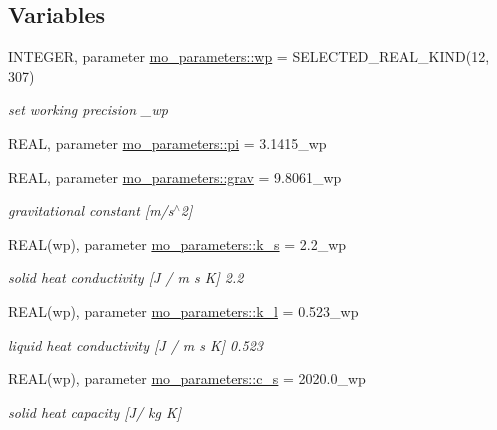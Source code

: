 \subsection*{Variables}
\begin{DoxyCompactItemize}
\item 
INTEGER, parameter \hyperlink{namespacemo__parameters_a41be20bed1dcec244405328deaaffe30}{mo\_\-parameters::wp} = SELECTED\_\-REAL\_\-KIND(12, 307)
\begin{DoxyCompactList}\small\item\em set working precision \_\-wp \item\end{DoxyCompactList}\item 
REAL, parameter \hyperlink{namespacemo__parameters_ae2c1c26c67cd8e13b7693bbe2c5b717a}{mo\_\-parameters::pi} = 3.1415\_\-wp
\item 
REAL, parameter \hyperlink{namespacemo__parameters_adb294212d96151a282d82819bb97de4b}{mo\_\-parameters::grav} = 9.8061\_\-wp
\begin{DoxyCompactList}\small\item\em gravitational constant \mbox{[}m/s$^\wedge$2\mbox{]} \item\end{DoxyCompactList}\item 
REAL(wp), parameter \hyperlink{namespacemo__parameters_ac0fbc3357bfcbb03857942aeefb16090}{mo\_\-parameters::k\_\-s} = 2.2\_\-wp
\begin{DoxyCompactList}\small\item\em solid heat conductivity \mbox{[}J / m s K\mbox{]} 2.2 \item\end{DoxyCompactList}\item 
REAL(wp), parameter \hyperlink{namespacemo__parameters_aee1eca61b39f2038e51bfe41f1fbd574}{mo\_\-parameters::k\_\-l} = 0.523\_\-wp
\begin{DoxyCompactList}\small\item\em liquid heat conductivity \mbox{[}J / m s K\mbox{]} 0.523 \item\end{DoxyCompactList}\item 
REAL(wp), parameter \hyperlink{namespacemo__parameters_ab81b5df9bf526e14b97f78bcf35019bf}{mo\_\-parameters::c\_\-s} = 2020.0\_\-wp
\begin{DoxyCompactList}\small\item\em solid heat capacity \mbox{[}J/ kg K\mbox{]} \item\end{DoxyCompactList}\item 

\end{DoxyCompactItemize}
